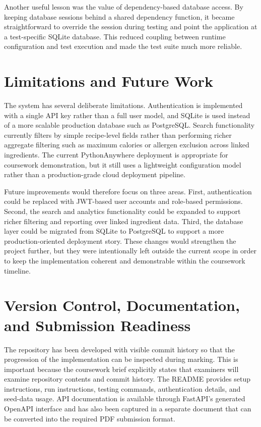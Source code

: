\documentclass[11pt,a4paper]{article}
\begin{document}
Another useful lesson was the value of dependency-based database access. By keeping database sessions behind a shared dependency function, it became straightforward to override the session during testing and point the application at a test-specific SQLite database. This reduced coupling between runtime configuration and test execution and made the test suite much more reliable.

\section{Limitations and Future Work}
The system has several deliberate limitations. Authentication is implemented with a single API key rather than a full user model, and SQLite is used instead of a more scalable production database such as PostgreSQL. Search functionality currently filters by simple recipe-level fields rather than performing richer aggregate filtering such as maximum calories or allergen exclusion across linked ingredients. The current PythonAnywhere deployment is appropriate for coursework demonstration, but it still uses a lightweight configuration model rather than a production-grade cloud deployment pipeline.

Future improvements would therefore focus on three areas. First, authentication could be replaced with JWT-based user accounts and role-based permissions. Second, the search and analytics functionality could be expanded to support richer filtering and reporting over linked ingredient data. Third, the database layer could be migrated from SQLite to PostgreSQL to support a more production-oriented deployment story. These changes would strengthen the project further, but they were intentionally left outside the current scope in order to keep the implementation coherent and demonstrable within the coursework timeline.

\section{Version Control, Documentation, and Submission Readiness}
The repository has been developed with visible commit history so that the progression of the implementation can be inspected during marking. This is important because the coursework brief explicitly states that examiners will examine repository contents and commit history. The README provides setup instructions, run instructions, testing commands, authentication details, and seed-data usage. API documentation is available through FastAPI's generated OpenAPI interface and has also been captured in a separate document that can be converted into the required PDF submission format.
\end{document}
